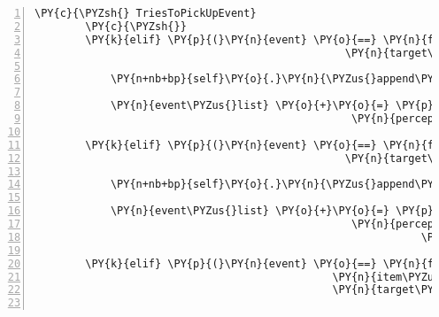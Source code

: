 \begin{Verbatim}[commandchars=\\\{\},numbers=left,firstnumber=1,stepnumber=1]
        \PY{c}{\PYZsh{} TriesToPickUpEvent}
        \PY{c}{\PYZsh{}}
        \PY{k}{elif} \PY{p}{(}\PY{n}{event} \PY{o}{==} \PY{n}{fabula}\PY{o}{.}\PY{n}{TriesToPickUpEvent}\PY{p}{(}\PY{n}{identifier}\PY{o}{=}\PY{n}{ID\PYZus{}CASSANDRA}\PY{p}{,}
                                                 \PY{n}{target\PYZus{}identifier}\PY{o}{=}\PY{l+s}{\PYZsq{}}\PY{l+s}{lute\PYZus{}broken}\PY{l+s}{\PYZsq{}}\PY{p}{)}\PY{p}{)}\PY{p}{:}

            \PY{n+nb+bp}{self}\PY{o}{.}\PY{n}{\PYZus{}append\PYZus{}sentence}\PY{p}{(}\PY{n}{ID\PYZus{}CASSANDRA}\PY{p}{,} \PY{l+s}{\PYZdq{}}\PY{l+s}{Ich habe eine Laute. Leider ist sie kaputt.}\PY{l+s}{\PYZdq{}}\PY{p}{)}

            \PY{n}{event\PYZus{}list} \PY{o}{+}\PY{o}{=} \PY{p}{[}\PY{n}{fabula}\PY{o}{.}\PY{n}{PerceptionEvent}\PY{p}{(}\PY{n}{identifier}\PY{o}{=}\PY{n}{ID\PYZus{}CASSANDRA}\PY{p}{,}
                                                  \PY{n}{perception}\PY{o}{=}\PY{l+s}{\PYZsq{}}\PY{l+s}{Vielleicht findet sich noch etwas um die Laute zu reparieren.}\PY{l+s}{\PYZsq{}}\PY{p}{)}\PY{p}{]}

        \PY{k}{elif} \PY{p}{(}\PY{n}{event} \PY{o}{==} \PY{n}{fabula}\PY{o}{.}\PY{n}{TriesToPickUpEvent}\PY{p}{(}\PY{n}{identifier}\PY{o}{=}\PY{n}{ID\PYZus{}CASSANDRA}\PY{p}{,}
                                                 \PY{n}{target\PYZus{}identifier}\PY{o}{=}\PY{l+s}{\PYZsq{}}\PY{l+s}{cake}\PY{l+s}{\PYZsq{}}\PY{p}{)}\PY{p}{)}\PY{p}{:}

            \PY{n+nb+bp}{self}\PY{o}{.}\PY{n}{\PYZus{}append\PYZus{}sentence}\PY{p}{(}\PY{n}{ID\PYZus{}CASSANDRA}\PY{p}{,} \PY{l+s}{\PYZdq{}}\PY{l+s}{Willst du ein Stück Kuchen?}\PY{l+s}{\PYZdq{}}\PY{p}{)}

            \PY{n}{event\PYZus{}list} \PY{o}{+}\PY{o}{=} \PY{p}{[}\PY{n}{fabula}\PY{o}{.}\PY{n}{PerceptionEvent}\PY{p}{(}\PY{n}{identifier}\PY{o}{=}\PY{n}{ID\PYZus{}CASSANDRA}\PY{p}{,}
                                                  \PY{n}{perception}\PY{o}{=}\PY{l+s}{\PYZsq{}}\PY{l+s}{Ich pack das Kuchenstück doch mal lieber ein, }\PY{l+s}{\PYZsq{}}
                                                             \PY{l+s}{\PYZsq{}}\PY{l+s}{für die lange Reise.}\PY{l+s}{\PYZsq{}}\PY{p}{)}\PY{p}{]}

        \PY{k}{elif} \PY{p}{(}\PY{n}{event} \PY{o}{==} \PY{n}{fabula}\PY{o}{.}\PY{n}{TriesToDropEvent}\PY{p}{(}\PY{n}{identifier}\PY{o}{=}\PY{n}{ID\PYZus{}CASSANDRA}\PY{p}{,}
                                               \PY{n}{item\PYZus{}identifier}\PY{o}{=}\PY{l+s}{\PYZsq{}}\PY{l+s}{pry}\PY{l+s}{\PYZsq{}}\PY{p}{,}
                                               \PY{n}{target\PYZus{}identifier}\PY{o}{=}\PY{l+s}{\PYZsq{}}\PY{l+s}{cake}\PY{l+s}{\PYZsq{}}\PY{p}{)}\PY{p}{)}\PY{p}{:}


\end{Verbatim}
